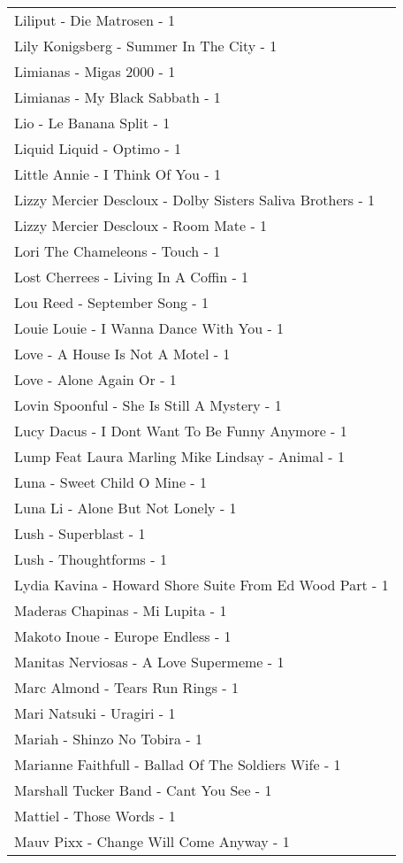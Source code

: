 \documentclass[
]{article}
\begin{document}
\begin{longtable}{l}
Liliput - Die Matrosen - 1 \\ 
Lily Konigsberg - Summer In The City - 1 \\ 
Limianas - Migas 2000 - 1 \\ 
Limianas - My Black Sabbath - 1 \\ 
Lio - Le Banana Split - 1 \\ 
Liquid Liquid - Optimo - 1 \\ 
Little Annie - I Think Of You - 1 \\ 
Lizzy Mercier Descloux - Dolby Sisters Saliva Brothers - 1 \\ 
Lizzy Mercier Descloux - Room Mate - 1 \\ 
Lori The Chameleons - Touch - 1 \\ 
Lost Cherrees - Living In A Coffin - 1 \\ 
Lou Reed - September Song - 1 \\ 
Louie Louie - I Wanna Dance With You - 1 \\ 
Love - A House Is Not A Motel - 1 \\ 
Love - Alone Again Or - 1 \\ 
Lovin Spoonful - She Is Still A Mystery - 1 \\ 
Lucy Dacus - I Dont Want To Be Funny Anymore - 1 \\ 
Lump Feat Laura Marling Mike Lindsay - Animal - 1 \\ 
Luna - Sweet Child O Mine - 1 \\ 
Luna Li - Alone But Not Lonely - 1 \\ 
Lush - Superblast - 1 \\ 
Lush - Thoughtforms - 1 \\ 
Lydia Kavina - Howard Shore Suite From Ed Wood Part - 1 \\ 
Maderas Chapinas - Mi Lupita - 1 \\ 
Makoto Inoue - Europe Endless - 1 \\ 
Manitas Nerviosas - A Love Supermeme - 1 \\ 
Marc Almond - Tears Run Rings - 1 \\ 
Mari Natsuki - Uragiri - 1 \\ 
Mariah - Shinzo No Tobira - 1 \\ 
Marianne Faithfull - Ballad Of The Soldiers Wife - 1 \\ 
Marshall Tucker Band - Cant You See - 1 \\ 
Mattiel - Those Words - 1 \\ 
Mauv Pixx - Change Will Come Anyway - 1 \\ 

\end{longtable}
\end{document}
